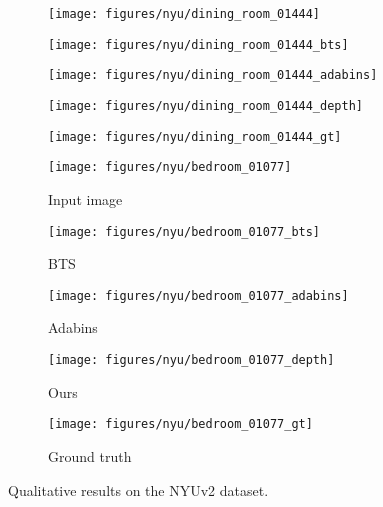 \documentclass[10pt,twocolumn,letterpaper]{article}
\begin{document}
\begin{figure*}[t]
\begin{subfigure}{0.3\columnwidth}
  \centering
  \texttt{[image: figures/nyu/dining\_room\_01444]}
\end{subfigure}
\begin{subfigure}{0.3\columnwidth}
  \centering
  \texttt{[image: figures/nyu/dining\_room\_01444\_bts]}
\end{subfigure}
\begin{subfigure}{0.3\columnwidth}
  \centering
  \texttt{[image: figures/nyu/dining\_room\_01444\_adabins]}
\end{subfigure}
\begin{subfigure}{0.3\columnwidth}
  \centering
  \texttt{[image: figures/nyu/dining\_room\_01444\_depth]}
\end{subfigure}
\begin{subfigure}{0.3\columnwidth}
  \centering
  \texttt{[image: figures/nyu/dining\_room\_01444\_gt]}
\end{subfigure}





\begin{subfigure}{0.3\columnwidth}
  \centering
  \texttt{[image: figures/nyu/bedroom\_01077]}
  \caption*{Input image}
\end{subfigure}
\begin{subfigure}{0.3\columnwidth}
  \centering
  \texttt{[image: figures/nyu/bedroom\_01077\_bts]}
  \caption*{BTS}
\end{subfigure}
\begin{subfigure}{0.3\columnwidth}
  \centering
  \texttt{[image: figures/nyu/bedroom\_01077\_adabins]}
  \caption*{Adabins}
\end{subfigure}
\begin{subfigure}{0.3\columnwidth}
  \centering
  \texttt{[image: figures/nyu/bedroom\_01077\_depth]}
  \caption*{Ours}
\end{subfigure}
\begin{subfigure}{0.3\columnwidth}
  \centering
  \texttt{[image: figures/nyu/bedroom\_01077\_gt]}
  \caption*{Ground truth}
\end{subfigure}

\vspace{-3mm}
\caption{Qualitative results on the NYUv2 dataset.}
\label{fig:res-nyu}
\vspace{-4mm}
\end{figure*}
\end{document}
